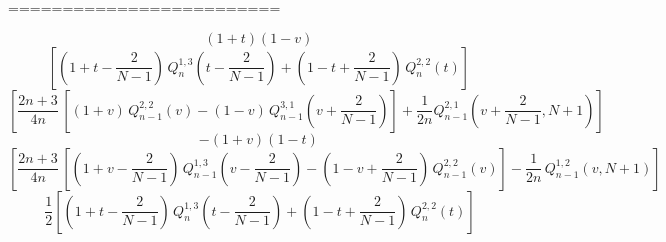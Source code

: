 \documentclass[12pt]{book}
\begin{document}
=========================



\begin{equation*}
(1+t)(1-v)\,
\end{equation*}
\begin{equation*}
\left[
\left(1+t-\frac{2}{N-1}\right)\,Q^{1,3}_{n}\left(t-\frac{2}{N-1}\right) + \left(1-t+\frac{2}{N-1}\right)\,Q^{2,2}_{n}\left(t\right)
\right]
\,
\end{equation*}
\begin{equation*}
\left[
 \frac{2n+3}{4n}\,\left[
  (1+v)\,Q^{2,2}_{n-1}\left(v\right)-
  (1-v)\,Q^{3,1}_{n-1}\left(v+\frac{2}{N-1}\right)
  \right] + \frac{1}{2n} Q^{2,1}_{n-1}\left(v+\frac{2}{N-1},N+1\right)
\right]
\end{equation*}
\begin{equation*}
  - (1+v)(1-t)\,
\end{equation*}
\begin{equation*}
  \left[
    \frac{2n+3}{4n}\,
  \left[
    \left(1+v-\frac{2}{N-1}\right)\,Q^{1,3}_{n-1}\left(v-\frac{2}{N-1}\right)-
  \left(1-v+\frac{2}{N-1}\right)\,Q^{2,2}_{n-1}\left(v\right)
  \right]
  - \frac{1}{2n}\, Q^{1,2}_{n-1}\left(v,N+1\right)
\right]
  \,
\end{equation*}
\begin{equation*}
  \frac12
\left[
\left(1+t-\frac{2}{N-1}\right)\,Q^{1,3}_{n}\left(t-\frac{2}{N-1}\right) + \left(1-t+\frac{2}{N-1}\right)\,Q^{2,2}_{n}\left(t\right)
\right]
\end{equation*}





%
%
\end{document}
